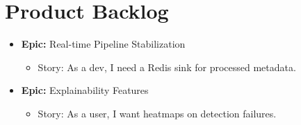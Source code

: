\documentclass[
]{report}
\author{}
\date{}
\providecommand{\tightlist}{%
  \setlength{\itemsep}{0pt}\setlength{\parskip}{0pt}}
\begin{document}
\newcommand{\theProjectName}{NOAA}
\newcommand{\theAuthor}{Rodrigo Souza dos Santos}

\chapter{Product Backlog}\label{product-backlog}

\begin{itemize}
\tightlist
\item[$\square$]
  \textbf{Epic:} Real-time Pipeline Stabilization

  \begin{itemize}
  \tightlist
  \item[$\square$]
    Story: As a dev, I need a Redis sink for processed metadata.
  \end{itemize}
\item[$\square$]
  \textbf{Epic:} Explainability Features

  \begin{itemize}
  \tightlist
  \item[$\square$]
    Story: As a user, I want heatmaps on detection failures.
  \end{itemize}
\end{itemize}
\end{document}
